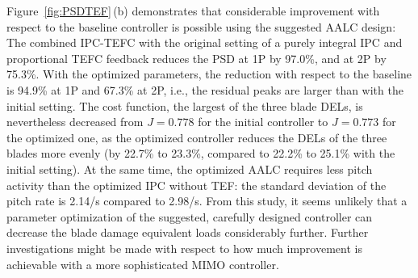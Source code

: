 Figure~\ref{fig:PSDTEF}\,(b) demonstrates that considerable improvement with respect to the baseline controller is possible using the suggested AALC design: The combined IPC-TEFC with the original setting of a purely integral IPC and proportional TEFC feedback reduces the PSD at 1P by 97.0\%, and at 2P by 75.3\%. With the optimized parameters, the reduction with respect to the baseline is 94.9\% at 1P and 67.3\% at 2P, i.e., the residual peaks are larger than with the initial setting. The cost function, the largest of the three blade DELs, is nevertheless decreased from $J = 0.778$ for the initial controller to $J = 0.773$ for the optimized one, as the optimized controller reduces the DELs of the three blades more evenly (by 22.7\% to 23.3\%, compared to 22.2\% to 25.1\% with the initial setting). At the same time, the optimized AALC requires less pitch activity than the optimized IPC without TEF: the standard deviation of the pitch rate is 2.14\textdegree/s compared to 2.98\textdegree/s.
From this study, it seems unlikely that a parameter optimization of the suggested, carefully designed controller can decrease the blade damage equivalent loads considerably further. Further investigations might be made with respect to how much improvement is achievable with a more sophisticated MIMO controller.

